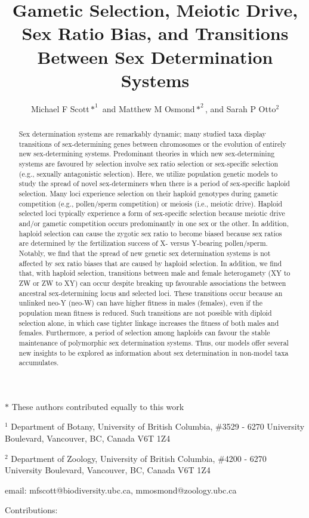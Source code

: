 \documentclass[12pt]{article}
\begin{document}
\title{Gametic Selection, Meiotic Drive, Sex Ratio Bias, and Transitions Between Sex Determination Systems}
\author{Michael F Scott$*^1$ and Matthew M Osmond$*^2$, and Sarah P Otto$^2$}
\date{}
\maketitle
\noindent
$*$ These authors contributed equally to this work

\noindent
$^1$ Department of Botany, University of British Columbia, \#3529 - 6270 University Boulevard, Vancouver, BC, Canada V6T 1Z4

\noindent
$^2$ Department of Zoology, University of British Columbia, \#4200 - 6270 University Boulevard, Vancouver, BC, Canada V6T 1Z4

\noindent
email: mfscott@biodiversity.ubc.ca, mmosmond@zoology.ubc.ca

\noindent
Contributions: 

\newpage
\linenumbers
\modulolinenumbers[2]

\begin{abstract}
Sex determination systems are remarkably dynamic; many studied taxa display transitions of sex-determining genes between chromosomes or the evolution of entirely new sex-determining systems. 
Predominant theories in which new sex-determining systems are favoured by selection involve sex ratio selection or sex-specific selection (e.g., sexually antagonistic selection). 
Here, we utilize population genetic models to study the spread of novel sex-determiners when there is a period of sex-specific haploid selection. 
Many loci experience selection on their haploid genotypes during gametic competition (e.g., pollen/sperm competition) or meiosis (i.e., meiotic drive). 
Haploid selected loci typically experience a form of sex-specific selection because meiotic drive and/or gametic competition occurs predominantly in one sex or the other. 
In addition, haploid selection can cause the zygotic sex ratio to become biased because sex ratios are determined by the fertilization success of X- versus Y-bearing pollen/sperm. 
Notably, we find that the spread of new genetic sex determination systems is not affected by sex ratio biases that are caused by haploid selection. 
In addition, we find that, with haploid selection, transitions between male and female heterogamety (XY to ZW or ZW to XY) can occur despite breaking up favourable associations the between ancestral sex-determining locus and selected loci.
These transitions occur because an unlinked neo-Y (neo-W) can have higher fitness in males (females), even if the population mean fitness is reduced. 
Such transitions are not possible with diploid selection alone, in which case tighter linkage increases the fitness of both males and females. 
Furthermore, a period of selection among haploids can favour the stable maintenance of polymorphic sex determination systems. 
Thus, our models offer several new insights to be explored as information about sex determination in non-model taxa accumulates.
\end{abstract}
\end{document}
